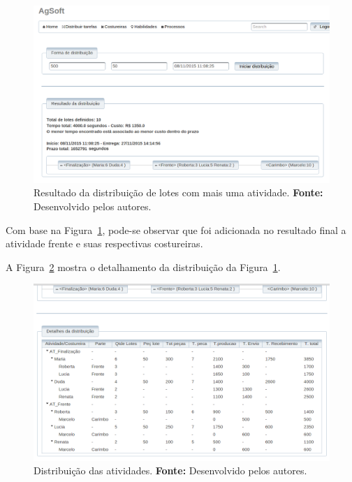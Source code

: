 \newpage

\begin{figure}[h!]
	\centerline{\includegraphics[width=14.7cm]{./imagens/resultado1_teste5.png}}
	\caption[Resultado da distribuição de lotes com mais uma atividade.]
	{Resultado da distribuição de lotes com mais uma atividade. \textbf{Fonte:} Desenvolvido pelos
	autores.}
	\label{fig:resultado1_teste5}
\end{figure}

\par Com base na Figura~\ref{fig:resultado1_teste5}, pode-se observar que foi
adicionada no resultado final a atividade frente e suas respectivas costureiras.

\par A Figura~\ref{fig:detalhamento1_teste5} mostra o detalhamento da
distribuição da Figura~\ref{fig:resultado1_teste5}.


\begin{figure}[h!]
	\centerline{\includegraphics[width=14.7cm]{./imagens/detalhamento1_teste5.png}}
	\caption[Distribuição das atividades.]
	{Distribuição das atividades. \textbf{Fonte:} Desenvolvido pelos
	autores.}
	\label{fig:detalhamento1_teste5}
\end{figure}

